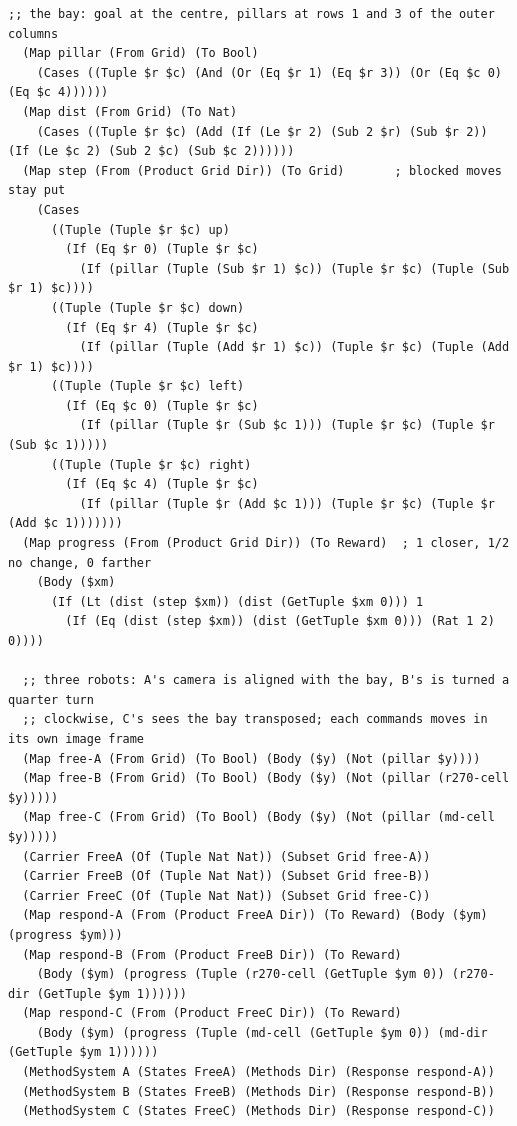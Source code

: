 \documentclass[11pt]{article}
\theoremstyle{definition}
\theoremstyle{plain}
\begin{document}
\begin{lstlisting}[style=mettafull]
  ;; the bay: goal at the centre, pillars at rows 1 and 3 of the outer columns
  (Map pillar (From Grid) (To Bool)
    (Cases ((Tuple $r $c) (And (Or (Eq $r 1) (Eq $r 3)) (Or (Eq $c 0) (Eq $c 4))))))
  (Map dist (From Grid) (To Nat)
    (Cases ((Tuple $r $c) (Add (If (Le $r 2) (Sub 2 $r) (Sub $r 2)) (If (Le $c 2) (Sub 2 $c) (Sub $c 2))))))
  (Map step (From (Product Grid Dir)) (To Grid)       ; blocked moves stay put
    (Cases
      ((Tuple (Tuple $r $c) up)
        (If (Eq $r 0) (Tuple $r $c)
          (If (pillar (Tuple (Sub $r 1) $c)) (Tuple $r $c) (Tuple (Sub $r 1) $c))))
      ((Tuple (Tuple $r $c) down)
        (If (Eq $r 4) (Tuple $r $c)
          (If (pillar (Tuple (Add $r 1) $c)) (Tuple $r $c) (Tuple (Add $r 1) $c))))
      ((Tuple (Tuple $r $c) left)
        (If (Eq $c 0) (Tuple $r $c)
          (If (pillar (Tuple $r (Sub $c 1))) (Tuple $r $c) (Tuple $r (Sub $c 1)))))
      ((Tuple (Tuple $r $c) right)
        (If (Eq $c 4) (Tuple $r $c)
          (If (pillar (Tuple $r (Add $c 1))) (Tuple $r $c) (Tuple $r (Add $c 1)))))))
  (Map progress (From (Product Grid Dir)) (To Reward)  ; 1 closer, 1/2 no change, 0 farther
    (Body ($xm)
      (If (Lt (dist (step $xm)) (dist (GetTuple $xm 0))) 1
        (If (Eq (dist (step $xm)) (dist (GetTuple $xm 0))) (Rat 1 2) 0))))

  ;; three robots: A's camera is aligned with the bay, B's is turned a quarter turn
  ;; clockwise, C's sees the bay transposed; each commands moves in its own image frame
  (Map free-A (From Grid) (To Bool) (Body ($y) (Not (pillar $y))))
  (Map free-B (From Grid) (To Bool) (Body ($y) (Not (pillar (r270-cell $y)))))
  (Map free-C (From Grid) (To Bool) (Body ($y) (Not (pillar (md-cell $y)))))
  (Carrier FreeA (Of (Tuple Nat Nat)) (Subset Grid free-A))
  (Carrier FreeB (Of (Tuple Nat Nat)) (Subset Grid free-B))
  (Carrier FreeC (Of (Tuple Nat Nat)) (Subset Grid free-C))
  (Map respond-A (From (Product FreeA Dir)) (To Reward) (Body ($ym) (progress $ym)))
  (Map respond-B (From (Product FreeB Dir)) (To Reward)
    (Body ($ym) (progress (Tuple (r270-cell (GetTuple $ym 0)) (r270-dir (GetTuple $ym 1))))))
  (Map respond-C (From (Product FreeC Dir)) (To Reward)
    (Body ($ym) (progress (Tuple (md-cell (GetTuple $ym 0)) (md-dir (GetTuple $ym 1))))))
  (MethodSystem A (States FreeA) (Methods Dir) (Response respond-A))
  (MethodSystem B (States FreeB) (Methods Dir) (Response respond-B))
  (MethodSystem C (States FreeC) (Methods Dir) (Response respond-C))


\end{lstlisting}
\end{document}
